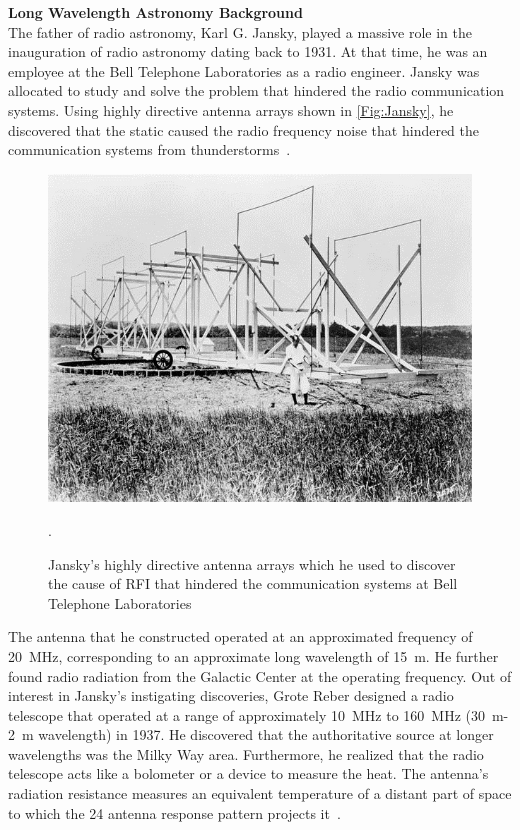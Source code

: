 	    {\bf{Long Wavelength Astronomy Background}}\\
	    
	    The father of radio astronomy, Karl G. Jansky, played a massive role in the inauguration of radio astronomy dating back to 1931. At that time, he was an employee at the Bell Telephone Laboratories as a radio engineer. Jansky was allocated to study and solve the problem that hindered the radio communication systems. Using highly directive antenna arrays shown in \autoref{Fig:Jansky}, he discovered that the static caused the radio frequency noise that hindered the communication systems from thunderstorms~\citep{book:BasicsofRA, book:RA}.\\
	    
	    \begin{figure}
	    	\begin{center}
	    		\includegraphics[width=0.7\linewidth]{Figures/jansky1.jpg}
	    		\caption{Jansky's highly directive antenna arrays which he used to discover the cause of RFI that hindered the communication systems at Bell Telephone Laboratories~\citep{book:BasicsofRA}}.
	    		\label{Fig:Jansky}
	    	\end{center}
	    \end{figure}
	    
	    The antenna that he constructed operated at an approximated frequency of \SI{20}{MHz}, corresponding to an approximate long wavelength of \SI{15}{m}. He further found radio radiation from the Galactic Center at the operating frequency. Out of interest in Jansky's instigating discoveries, Grote Reber designed a radio telescope that operated at a range of approximately \SI{10}{MHz} to \SI{160}{MHz} (\SI{30}{m}-\SI{2}{m} wavelength) in 1937. He discovered that the authoritative source at longer wavelengths was the Milky Way area. Furthermore, he realized that the radio telescope acts like a bolometer or a device to measure the heat. The antenna's radiation resistance measures an equivalent temperature of a distant part of space to which the 24 antenna response pattern projects it~\citep{1988JRASC..82...93R, CosmicStatic,2012PASP..124.1090H}.
	    
